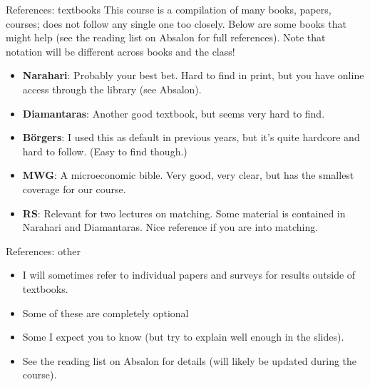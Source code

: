\documentclass[english,10pt
,aspectratio=169
]{beamer}
\begin{document}
\begin{frame}{References: textbooks}
	This course is a compilation of many books, papers, courses; does not follow any single one too closely. Below are some books that might help (see the reading list on Absalon for full references). Note that notation will be different across books and the class!
	\begin{itemize}%
		\item \alert{\textbf{Narahari}}: Probably your best bet. Hard to find in print, but you have online access through the library (see Absalon).
		\item \textbf{Diamantaras}: Another good textbook, but seems very hard to find.
		\item \textbf{B\"{o}rgers}: I used this as default in previous years, but it's quite hardcore and hard to follow. (Easy to find though.)
		\item \textbf{MWG}: A microeconomic bible. Very good, very clear, but has the smallest coverage for our course.
		\item \textbf{RS}: Relevant for two lectures on matching. Some material is contained in Narahari and Diamantaras. Nice reference if you are into matching.
	\end{itemize}

\end{frame}


\begin{frame}{References: other}
	\begin{itemize}
		\item I will sometimes refer to individual papers and surveys for results outside of textbooks.
		\item Some of these are completely optional 
		\item Some I expect you to know (but try to explain well enough in the slides).
		\item See the reading list on Absalon for details (will likely be updated during the course).
	\end{itemize}
\end{frame}
\end{document}
